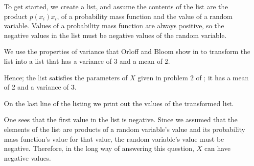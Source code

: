 \documentclass[a4paper,11pt]{article}
\begin{document}
To get started, we create a list, and assume the contents of the list are
the product $p \left(x_{i} \right) x_{i}$, of a probability mass function and
the value of a random variable.  Values of a probability mass function are
always positive, so the negative values in the list must be negative values
of the random variable.

We use the properties of variance that Orloff and Bloom show in \cite{reading5a}
to transform the list into a list that has a variance of 3 and a mean of 2.

Hence; the list satisfies the parameters of $X$ given in problem 2 of
\cite{reading5aQuestions}; it has a mean of 2 and a variance of 3.

On the last line of the listing we print out the values of the transformed list.

One sees that the first value in the list is negative.  Since we assumed that
the elements of the list are products of a random variable's value and its
probability mass function's value for that value, the random variable's value
must be negative.  Therefore, in the long way of answering this question, $X$
can have negative values.


\printbibliography{}
\end{document}
